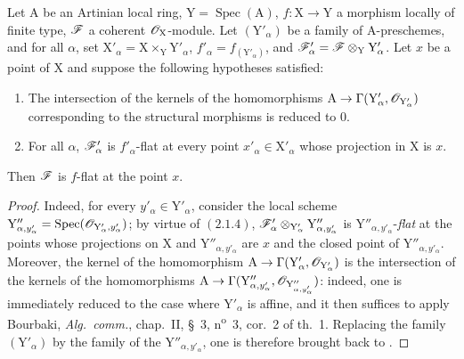 \begin{corollary}[11.4.13]
\label{IV.11.4.13}
Let $\mathrm{A}$ be an Artinian local ring, $\mathrm{Y}=\operatorname{Spec}(\mathrm{A})$, $f:\mathrm{X}\to\mathrm{Y}$ a
morphism locally of finite type, $\mathscr{F}$ a coherent $\mathscr{O}_\mathrm{X}$-module. Let $(\mathrm{Y}'_\alpha)$ be a family of
$\mathrm{A}$-preschemes, and for all $\alpha$, set $\mathrm{X}'_\alpha=\mathrm{X}\times_\mathrm{Y}\mathrm{Y}'_\alpha$, $f'_\alpha=f_{(\mathrm{Y}'_\alpha)}$, and $\mathscr{F}'_\alpha=\mathscr{F}\otimes_\mathrm{Y}\mathrm{Y}'_\alpha$. Let $x$ be a point
of $\mathrm{X}$ and suppose the following hypotheses satisfied:
\begin{enumerate}[label=\textup{(\roman*)}]
  \item The intersection of the kernels of the homomorphisms $\mathrm{A}\to\Gamma(\mathrm{Y}'_\alpha,\mathscr{O}_{\mathrm{Y}'_\alpha})$ corresponding to the
  structural morphisms is reduced to $0$.
  \item For all $\alpha$, $\mathscr{F}'_\alpha$ is $f'_\alpha$-flat at \textup{every} point $x'_\alpha\in\mathrm{X}'_\alpha$ whose projection in $\mathrm{X}$ is $x$.
\end{enumerate}

Then $\mathscr{F}$ is $f$-flat at the point $x$.
\end{corollary}

\begin{proof}
Indeed, for every $y'_\alpha\in\mathrm{Y}'_\alpha$, consider the local scheme
$\mathrm{Y}''_{\alpha,y'_\alpha}=\operatorname{Spec}(\mathscr{O}_{\mathrm{Y}'_\alpha,y'_\alpha})$; by
virtue of $(2.1.4)$, $\mathscr{F}'_\alpha\otimes_{\mathrm{Y}'_\alpha}\mathrm{Y}''_{\alpha,y'_\alpha}$ is
$\mathrm{Y}''_{\alpha,y'_\alpha}$-\emph{flat} at the points whose projections on $\mathrm{X}$ and
$\mathrm{Y}''_{\alpha,y'_\alpha}$ are $x$ and the closed point of $\mathrm{Y}''_{\alpha,y'_\alpha}$.
Moreover, the kernel of the homomorphism
$\mathrm{A}\to\Gamma(\mathrm{Y}'_\alpha,\mathscr{O}_{\mathrm{Y}'_\alpha})$ is the intersection of the kernels of the homomorphisms
$\mathrm{A}\to\Gamma(\mathrm{Y}''_{\alpha,y'_\alpha},\mathscr{O}_{\mathrm{Y}''_{\alpha,y'_\alpha}})$:
indeed, one is immediately reduced to the case where $\mathrm{Y}'_\alpha$ is affine, and it then suffices to apply Bourbaki, \emph{Alg.\ comm.},
chap.~II, \S~3, n\textsuperscript{o}~3, cor.~2 of th.~1. Replacing the family $(\mathrm{Y}'_\alpha)$ by the family of the $\mathrm{Y}''_{\alpha,y'_\alpha}$,
one is therefore brought back to .
\end{proof}

